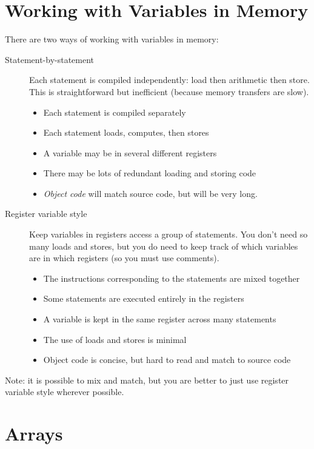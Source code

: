 \section{Working with Variables in Memory}\label{sec:working_with_variables_in_memory}

There are two ways of working with variables in memory:
\begin{description}
	\item[Statement-by-statement] Each statement is compiled independently: load then arithmetic then store. This is straightforward but inefficient (because memory transfers are slow).
	      \begin{itemize}
		      \item Each statement is compiled separately
		      \item Each statement loads, computes, then stores
		      \item A variable may be in several different registers
		      \item There may be lots of redundant loading and storing code
		      \item \emph{Object code} will match source code, but will be very long.
	      \end{itemize}
	\item[Register variable style] Keep variables in registers access a group of statements. You don't need so many loads and stores, but you do need to keep track of which variables are in which registers (so you must use comments).
	      \begin{itemize}
		      \item The instructions corresponding to the statements are mixed together
		      \item Some statements are executed entirely in the registers
		      \item A variable is kept in the same register across many statements
		      \item The use of loads and stores is minimal
		      \item Object code is concise, but hard to read and match to source code
	      \end{itemize}
\end{description}

\begin{note}
	Note: it is possible to mix and match, but you are better to just use register variable style wherever possible.
\end{note}

\section{Arrays}\label{sec:arrays}

